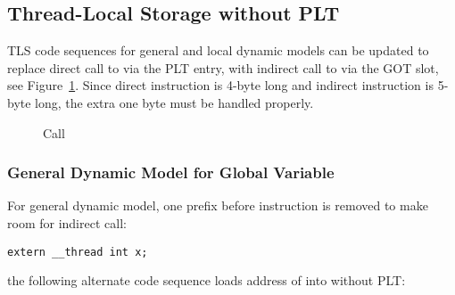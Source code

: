 \subsection{Thread-Local Storage without PLT}

TLS code sequences for general and local dynamic models can be updated to
replace direct call to  via the PLT entry,
with indirect call to  via the GOT slot, see
Figure~\ref{__tls_get_addr}.  Since direct
 instruction is 4-byte long and indirect 
instruction is 5-byte long, the extra one byte must be handled properly.

\begin{figure}[H]
\Hrule
\caption{ Call}
\label{__tls_get_addr}
\begin{center}
\myfontsize{}
\end{center}
\Hrule
\end{figure}

\subsubsection{General Dynamic Model for Global Variable}

For general dynamic model, one  prefix before 
instruction is removed to make room for indirect call:

\begin{verbatim}
extern __thread int x;
\end{verbatim}

\noindent
the following alternate code sequence loads address of  into
 without PLT:

\begin{table}[H]
\Hrule
\caption{General Dynamic Model Code Sequence (LP64)}
\begin{center}
\myfontsize{}
\end{center}
\Hrule
\end{table}

